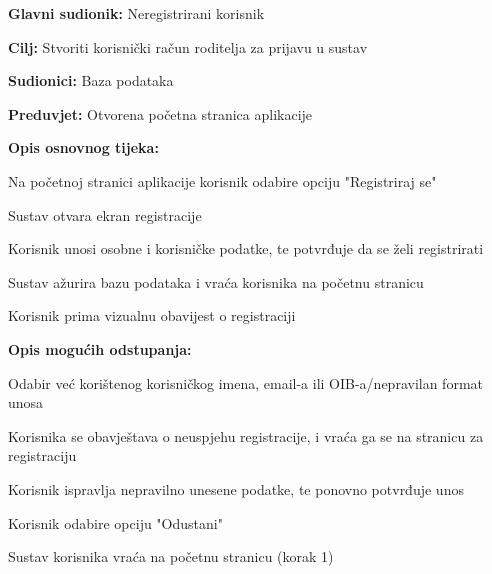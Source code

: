					\begin{packed_item}
						
						\item \textbf{Glavni sudionik: }Neregistrirani korisnik
						\item  \textbf{Cilj:} Stvoriti korisnički račun roditelja za prijavu u sustav
						\item  \textbf{Sudionici:} Baza podataka
						\item  \textbf{Preduvjet:} Otvorena početna stranica aplikacije
						\item  \textbf{Opis osnovnog tijeka:}
						
						\item[] \begin{packed_enum}
							
							\item Na početnoj stranici aplikacije korisnik odabire opciju "Registriraj se"
							\item Sustav otvara ekran registracije
							\item Korisnik unosi osobne i korisničke podatke, te potvrđuje da se želi registrirati
							\item Sustav ažurira bazu podataka i vraća korisnika na početnu stranicu
							\item Korisnik prima vizualnu obavijest o registraciji
						\end{packed_enum}
						
						\item  \textbf{Opis mogućih odstupanja:}
						\item[] \begin{packed_item}
							\item[2.a] Odabir već korištenog korisničkog imena, email-a ili OIB-a/nepravilan format unosa
							\item[] \begin{packed_enum}
								\item Korisnika se obavještava o neuspjehu registracije, i vraća ga se na stranicu za registraciju
								\item Korisnik ispravlja nepravilno unesene podatke, te ponovno potvrđuje unos
							\end{packed_enum}
							\item[3.a] Korisnik odabire opciju "Odustani"
							\item[] \begin{packed_enum}
								\item Sustav korisnika vraća na početnu stranicu (korak 1)
							\end{packed_enum}
							
						\end{packed_item}
					\end{packed_item}
					
